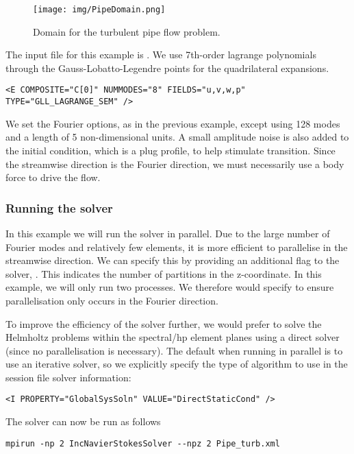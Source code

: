 \begin{figure}
\begin{center}
\texttt{[image: img/PipeDomain.png]}
\caption{Domain for the turbulent pipe flow problem.}
\label{f:incns:turbpipemesh}
\end{center}
\end{figure}

The input file for this example is . We use 7th-order
lagrange polynomials through the Gauss-Lobatto-Legendre points for the
quadrilateral expansions.
\begin{lstlisting}[style=XMLStyle]
<E COMPOSITE="C[0]" NUMMODES="8" FIELDS="u,v,w,p" TYPE="GLL_LAGRANGE_SEM" />
\end{lstlisting}
We set the Fourier options, as in the previous example, except using 128
modes and a length of 5 non-dimensional units. A small amplitude noise is also
added to the initial condition, which is a plug profile, to help stimulate
transition. Since the streamwise direction is the Fourier direction, we must
necessarily use a body force to drive the flow.

\subsubsection{Running the solver}
In this example we will run the solver in parallel. Due to the large number of
Fourier modes and relatively few elements, it is more efficient to parallelise
in the streamwise direction. We can specify this by providing an additional flag
to the solver, . This indicates the number of partitions in the
z-coordinate. In this example, we will only run two processes. We therefore
would specify  to ensure parallelisation only occurs in the
Fourier direction.

To improve the efficiency of the solver further, we would prefer to solve
the Helmholtz problems within the spectral/hp element planes using a
direct solver (since no parallelisation is necessary). The default when
running in parallel is to use an iterative solver, so we explicitly
specify the type of algorithm to use in the session file solver
information:
\begin{lstlisting}[style=XMLStyle]
<I PROPERTY="GlobalSysSoln" VALUE="DirectStaticCond" />
\end{lstlisting}

The solver can now be run as follows
\begin{lstlisting}[style=BashInputStyle]
mpirun -np 2 IncNavierStokesSolver --npz 2 Pipe_turb.xml
\end{lstlisting}

